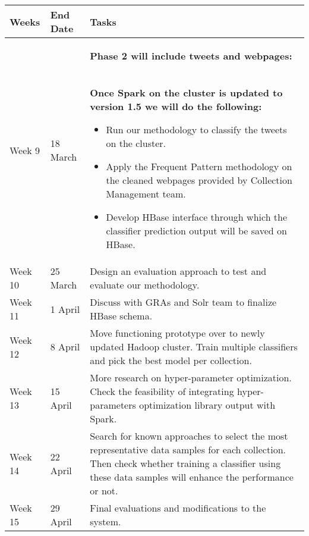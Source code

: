 \newpage
\begin{tabularx}{155mm}{|>{\setlength\hsize{.2\hsize}\setlength\linewidth{\hsize}}X|>{\setlength\hsize{.3\hsize}\setlength\linewidth{\hsize}}X|>{\setlength\hsize{1.5\hsize}\setlength\linewidth{\hsize}}X|}
\hline
Weeks & End Date & Tasks \\
\hline
Week 9
&
18 March
&
\textbf{Phase 2 will include tweets and webpages:} \

\textbf{Once Spark on the cluster is updated to version 1.5 we will do the following:}

\begin{itemize}
\item Run our methodology to classify the tweets on the cluster.
\item Apply the Frequent Pattern methodology on the cleaned webpages provided by Collection Management team.
\item Develop HBase interface through which the classifier prediction output will be saved on HBase.
\end{itemize}\\
\hline

Week 10
&
25 March
&
Design an evaluation approach to test and evaluate our methodology. \\
\hline

Week 11
&
1 April
&
Discuss with GRAs and Solr team to finalize HBase schema. \\
\hline

Week 12
&
8 April
&
Move functioning prototype over to newly updated Hadoop cluster. Train multiple classifiers and pick the best model per collection. \\
\hline

Week 13
&
15 April
&
More research on hyper-parameter optimization. Check the feasibility of integrating hyper-parameters optimization library \cite{bergstra2013hyperopt} output with Spark. \\
\hline

Week 14
&
22 April
&
Search for known approaches to select the most representative data samples for each collection. Then check whether training a classifier using these data samples will enhance the performance or not. \\
\hline

Week 15
&
29 April
&
Final evaluations and modifications to the system. \\
\hline

\end{tabularx}